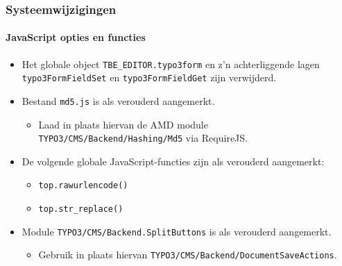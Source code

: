 \begin{frame}[fragile]
	\frametitle{Systeemwijzigingen}
	\framesubtitle{JavaScript opties en functies}

	\begin{itemize}

		\item Het globale object \texttt{TBE\_EDITOR.typo3form} en z'n achterliggende lagen \texttt{typo3FormFieldSet}
			en \texttt{typo3FormFieldGet} zijn verwijderd.

		\item Bestand \texttt{md5.js} is als verouderd aangemerkt.

			\begin{itemize}\smaller
				\item[\ding{228}] Laad in plaats hiervan de AMD module \texttt{TYPO3/CMS/Backend/Hashing/Md5} via RequireJS.
			\end{itemize}\normalsize

		\item De volgende globale JavaScript-functies zijn als verouderd aangemerkt:

			\begin{itemize}
				\item \texttt{top.rawurlencode()}
				\item \texttt{top.str\_replace()}
			\end{itemize}

		\item Module \texttt{TYPO3/CMS/Backend.SplitButtons} is als verouderd aangemerkt.

			\begin{itemize}\smaller
				\item[\ding{228}] Gebruik in plaats hiervan \texttt{TYPO3/CMS/Backend/DocumentSaveActions}.
			\end{itemize}\normalsize

 	\end{itemize}

\end{frame}


